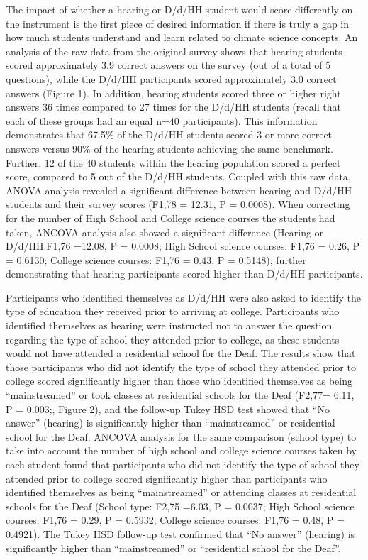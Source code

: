 \documentclass[11.5pt]{sig-alternate} %
\begin{document}
\begin{large}
The impact of whether a hearing or D/d/HH student would score differently on the instrument is the first piece of desired information if there is truly a gap in how much students understand and learn related to climate science concepts. An analysis of the raw data from the original survey shows that hearing students scored approximately 3.9 correct answers on the survey (out of a total of 5 questions), while the D/d/HH participants scored approximately 3.0 correct answers (Figure 1). In addition, hearing students scored three or higher right answers 36 times compared to 27 times for the D/d/HH students (recall that each of these groups had an equal n=40 participants). This information demonstrates that 67.5\% of the D/d/HH students scored 3 or more correct answers versus 90\% of the hearing students achieving the same benchmark. Further, 12 of the 40 students within the hearing population scored a perfect score, compared to 5 out of the D/d/HH students. Coupled with this raw data, ANOVA analysis revealed a significant difference between hearing and D/d/HH students and their survey scores (F1,78 =  12.31, P = 0.0008). When correcting for the number of High School and College science courses the students had taken, ANCOVA analysis also showed a significant difference (Hearing or D/d/HH:F1,76 =12.08, P = 0.0008; High School science courses: F1,76 = 0.26, P = 0.6130; College science courses: F1,76 = 0.43, P = 0.5148), further demonstrating that hearing participants scored higher than D/d/HH participants.

Participants who identified themselves as D/d/HH were also asked to identify the type of education they received prior to arriving at college. Participants who identified themselves as hearing were instructed not to answer the question regarding the type of school they attended prior to college, as these students would not have attended a residential school for the Deaf. The results show that those participants who did not identify the type of school they attended prior to college scored significantly higher than those who identified themselves as being “mainstreamed” or took classes at residential schools for the Deaf (F2,77=  6.11, P = 0.003;, Figure 2), and the follow-up Tukey HSD test showed that “No answer” (hearing) is significantly higher than “mainstreamed” or residential school for the Deaf. ANCOVA analysis for the same comparison (school type) to take into account the number of high school and college science courses taken by each student found that participants who did not identify the type of school they attended prior to college scored significantly higher than participants who identified themselves as being “mainstreamed” or attending classes at residential schools for the Deaf (School type: F2,75 =6.03, P = 0.0037; High School science courses: F1,76 = 0.29, P = 0.5932; College science courses: F1,76 = 0.48, P = 0.4921). The Tukey HSD follow-up test confirmed that “No answer” (hearing) is significantly higher than “mainstreamed” or “residential school for the Deaf”. 


\end{large}
\end{document}
